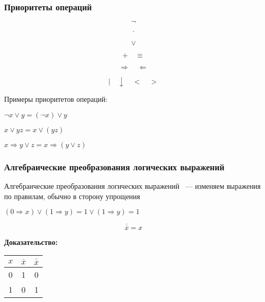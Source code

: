 \documentclass[russian]{lecture-notes}
\begin{document}
\begin{sloppypar}
\subsubsection{Приоритеты операций}
	
	$$\neg$$
	
	$$\cdot$$
	
	$$\lor$$
	
	$$+ \quad \equiv$$
	
	$$\Rightarrow \quad \Leftarrow$$
	
	$$| \quad \downarrow \quad < \quad >$$
	
\begin{example}
	Примеры приоритетов операций:
	
	$\neg x \lor y = (\neg x) \lor y$
	
	$x \lor y z = x \lor (y z)$
	
	$x \Rightarrow y \lor z = x \Rightarrow (y \lor z)$
\end{example}	

\subsubsection{Алгебраические преобразования логических выражений}

\begin{definition} 
	Алгебраические преобразования логических выражений ~--- изменяем выражения по правилам, обычно в сторону упрощения
\end{definition}

\begin{example}
	$(0 \Rightarrow x) \lor (1 \Rightarrow y) = 1 \lor (1 \Rightarrow y) = 1$
\end{example}

\begin{proposition*}
    $$\overline{\overline{x}} = x$$
    
    \textbf{Доказательство:}
    
    \begin{table}[h!]
		\centering		
		\begin{tabular}{|c|c|c|}
			\hline
			$x$ & $\overline{x}$ & $\overline{\overline{x}}$ \\ \hline
			0 & 1 & 0 \\ \hline
			1 & 0 & 1 \\ \hline
		\end{tabular}
	\end{table}

\end{proposition*}


\end{sloppypar}
\end{document}
